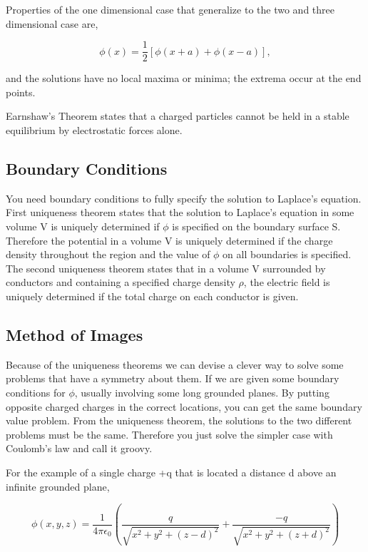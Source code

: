\documentclass[preprint, review,12pt]{elsarticle}
\begin{document}
Properties of the one dimensional case that generalize to the two and three dimensional case are,

\begin{equation}
    \phi(x) = \frac{1}{2}[\phi(x+a) + \phi(x-a)],
\end{equation}

and the solutions have no local maxima or minima; the extrema occur at the end points. 

Earnshaw's Theorem states that a charged particles cannot be held in a stable equilibrium by electrostatic forces alone.

\subsection{Boundary Conditions}

You need boundary conditions to fully specify the solution to Laplace's equation. First uniqueness theorem states that the solution to Laplace's equation in some volume V is uniquely determined if $\phi$ is specified on the boundary surface S. Therefore the potential in a volume V is uniquely determined if the charge density throughout the region and the value of $\phi$ on all boundaries is specified. The second uniqueness theorem states that in a volume V surrounded by conductors and containing a specified charge density $\rho$, the electric field is uniquely determined if the total charge on each conductor is given.

\subsection{Method of Images}

Because of the uniqueness theorems we can devise a clever way to solve some problems that have a symmetry about them. If we are given some boundary conditions for $\phi$, usually involving some long grounded planes. By putting opposite charged charges in the correct locations, you can get the same boundary value problem. From the uniqueness theorem, the solutions to the two different problems must be the same. Therefore you just solve the simpler case with Coulomb's law and call it groovy.

For the example of a single charge +q that is located a distance d above an infinite grounded plane, 

\begin{equation}
    \phi(x,y,z) = \frac{1}{4 \pi \epsilon_0}(\frac{q}{\sqrt{x^2+y^2+(z-d)^2}} + \frac{-q}{\sqrt{x^2+y^2+(z+d)^2}})
\end{equation}
\end{document}
